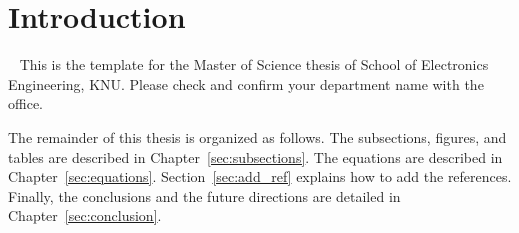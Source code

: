 \section{Introduction}~\label{sec:introduction}
This is the template for the Master of Science thesis of School of Electronics Engineering, KNU. Please check and confirm your department name with the office.

The remainder of this thesis is organized as follows. The subsections, figures, and tables are described in Chapter~\ref{sec:subsections}. The equations are described in Chapter~\ref{sec:equations}. Section~\ref{sec:add_ref} explains how to add the references. Finally, the conclusions and the future directions are detailed in Chapter~\ref{sec:conclusion}.

